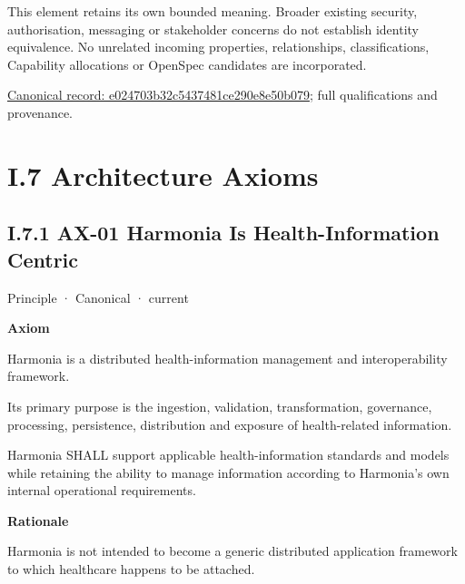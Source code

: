 This element retains its own bounded meaning. Broader existing security,
authorisation, messaging or stakeholder concerns do not establish identity
equivalence. No unrelated incoming properties, relationships, classifications,
Capability allocations or OpenSpec candidates are incorporated.


{\footnotesize \href{../../../../../../../continuum/motivation/constraint/mandate/e024703b32c5437481ce290e8e50b079.md}{Canonical record: e024703b32c5437481ce290e8e50b079}; full qualifications and provenance.}\par
\chapter*{I.7 Architecture Axioms}
\label{navigation:I.7}

\section*{I.7.1 AX-01 Harmonia Is Health-Information Centric}
\label{navigation:I.7.1}

\label{element:e9bd61acaaea4577bc4086a5639e52c3}
{\small Principle · Canonical · current}\par

\par\medskip\textbf{Axiom}\par


Harmonia is a distributed health-information management and
interoperability framework.



Its primary purpose is the ingestion, validation, transformation,
governance, processing, persistence, distribution and exposure of
health-related information.



Harmonia SHALL support applicable health-information standards and
models while retaining the ability to manage information according to
Harmonia's own internal operational requirements.



\par\medskip\textbf{Rationale}\par


Harmonia is not intended to become a generic distributed application
framework to which healthcare happens to be attached.



